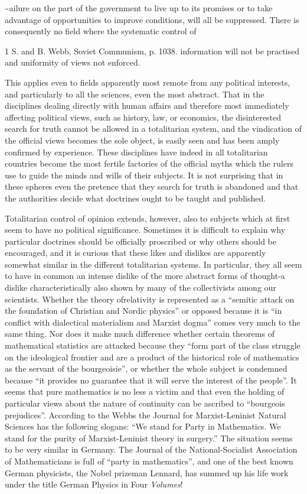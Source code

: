 \documentclass[11pt,openany]{book}
\begin{document}
\textasciitilde{}ailure on the part of the government to live up to its promises or to take advantage of opportunities to improve conditions, will all be suppressed. There is consequently no field where the systematic control of

1 S. and B. Webb, Soviet Communism, p. 1038. information will not be practised and uniformity of views not enforced.

This applies even to fields apparently most remote from any political interests, and particularly to all the sciences, even the most abstract. That in the disciplines dealing directly with human affairs and therefore most immediately affecting political views, such as history, law, or economics, the disinterested search for truth cannot be allowed in a totalitarian system, and the vindication of the official views becomes the sole object, is easily seen and has been amply confirmed by experience. These disciplines have indeed in all totalitarian countries become the most fertile factories of the official myths which the rulers use to guide the minds and wills of their subjects. It is not surprising that in these spheres even the pretence that they search for truth is abandoned and that the authorities decide what doctrines ought to be taught and published.

Totalitarian control of opinion extends, however, also to subjects which at first seem to have no political significance. Sometimes it is difficult to explain why particular doctrines should be officially proscribed or why others should be encouraged, and it is curious that these likes and dislikes are apparently somewhat similar in the different totalitarian systems. In particular, they all seem to have in common an intense dislike of the more abstract forms of thought-a dislike characteristically also shown by many of the collectivists among our scientists. Whether the theory ofrelativity is represented as a ``semitic attack on the foundation of Christian and Nordic physics'' or opposed because it is ``in conflict with dialectical materialism and Marxist dogma'' comes very much to the same thing. Nor does it make much difference whether certain theorems of mathematical statistics are attacked because they ``form part of the class struggle on the ideological frontier and are a product of the historical role of mathematics as the servant of the bourgeoisie'', or whether the whole subject is condemned because ``it provides no guarantee that it will serve the interest of the people''. It seems that pure mathematics is no less a victim and that even the holding of particular views about the nature of continuity can be ascribed to ``bourgeois prejudices''. According to the Webbs the Journal for Marxist-Leninist Natural Sciences has the following slogans: ``We stand for Party in Mathematics. We stand for the purity of Marxist-Leninist theory in surgery.'' The situation seems to be very similar in Germany. The Journal of the National-Socialist Association of Mathematicians is full of ``party in mathematics'', and one of the best known German physicists, the Nobel prizeman Lennard, has summed up his life work under the title German Physics in Four \emph{Volumes}!
\end{document}
